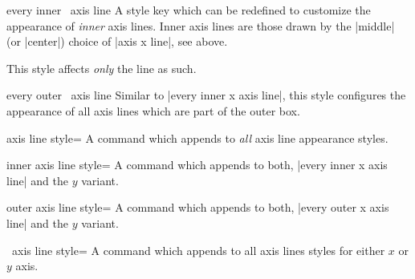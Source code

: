 \begin{pgfplotsxykey}{every inner \x\ axis line}
	A style key which can be redefined to customize the appearance of \emph{inner} axis lines. Inner axis lines are those drawn by the |middle| (or |center|) choice of |axis x line|, see above.

	This style affects \emph{only} the line as such.
\begin{codeexample}[]
\end{codeexample}
\end{pgfplotsxykey}

\begin{pgfplotsxykey}{every outer \x\ axis line}
	Similar to |every inner x axis line|, this style configures the appearance of all axis lines which are part of the outer box.
\begin{codeexample}[]
\end{codeexample}
\end{pgfplotsxykey}

\label{pgfplots:page:axislines}
\begin{pgfplotskey}{axis line style=}
	A command which appends  to \emph{all} axis line appearance styles.
\end{pgfplotskey}

\begin{pgfplotskey}{inner axis line style=}
	A command which appends  to both, |every inner x axis line| and the $y$ variant.
\end{pgfplotskey}
\begin{pgfplotskey}{outer axis line style=}
	A command which appends  to both, |every outer x axis line| and the $y$ variant.
\end{pgfplotskey}
\begin{pgfplotsxykey}{\x\ axis line style=}
	A command which appends  to all axis lines styles for either $x$ or $y$ axis.
\end{pgfplotsxykey}

